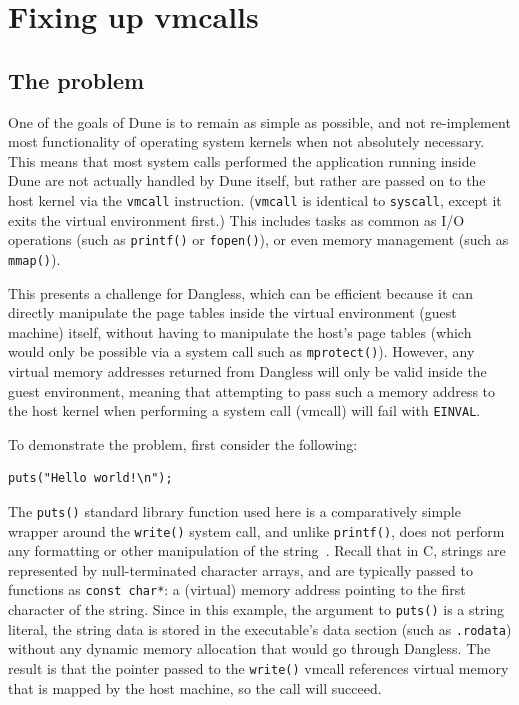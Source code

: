 \section{Fixing up vmcalls}
\label{sec:vmcall-pointer-rewriting}

\subsection{The problem}

One of the goals of Dune is to remain as simple as possible, and not re-implement most functionality of operating system kernels when not absolutely necessary. This means that most system calls performed the application running inside Dune are not actually handled by Dune itself, but rather are passed on to the host kernel via the \lstinline!vmcall! instruction. (\lstinline!vmcall! is identical to \lstinline!syscall!, except it exits the virtual environment first.) This includes tasks as common as I/O operations (such as \lstinline!printf()! or \lstinline!fopen()!), or even memory management (such as \lstinline!mmap()!).

This presents a challenge for Dangless, which can be efficient because it can directly manipulate the page tables inside the virtual environment (guest machine) itself, without having to manipulate the host's page tables (which would only be possible via a system call such as \lstinline!mprotect()!). However, any virtual memory addresses returned from Dangless will only be valid inside the guest environment, meaning that attempting to pass such a memory address to the host kernel when performing a system call (vmcall) will fail with \lstinline!EINVAL!.

To demonstrate the problem, first consider the following:

\begin{lstlisting}
puts("Hello world!\n");
\end{lstlisting}

The \lstinline!puts()! standard library function used here is a comparatively simple wrapper around the \lstinline!write()! system call, and unlike \lstinline!printf()!, does not perform any formatting or other manipulation of the string~\cite{glibc-puts-analysis}. Recall that in C, strings are represented by null-terminated character arrays, and are typically passed to functions as \lstinline!const char*!: a (virtual) memory address pointing to the first character of the string. Since in this example, the argument to \lstinline!puts()! is a string literal, the string data is stored in the executable's data section (such as \texttt{.rodata}) without any dynamic memory allocation that would go through Dangless. The result is that the pointer passed to the \lstinline!write()! vmcall references virtual memory that is mapped by the host machine, so the call will succeed.

